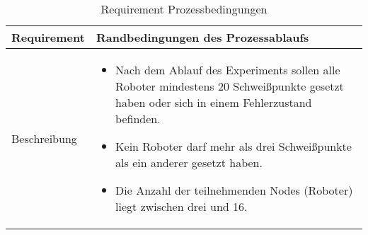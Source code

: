 \begin{table}[h!]
\begin{center}
\begin{tabular}{ |p{2.5cm}|p{11cm}| } 
 \hline
 Requirement & Randbedingungen des Prozessablaufs \\
 \hline
 Beschreibung &
 \begin{itemize}
  \item Nach dem Ablauf des Experiments sollen alle Roboter mindestens 20 Schweißpunkte
  gesetzt haben oder sich in einem Fehlerzustand befinden.
  \item Kein Roboter darf mehr als drei Schweißpunkte als ein anderer gesetzt haben.
  \item Die Anzahl der teilnehmenden Nodes (Roboter) liegt zwischen drei und 16.
 \end{itemize} \\
 \hline
\end{tabular}
\caption{Requirement Prozessbedingungen}
\label{table:reqprocess}
\end{center}
\end{table}

\clearpage

